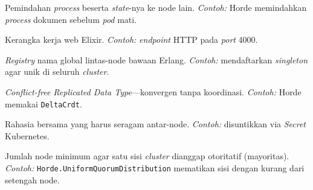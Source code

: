 \begin{description}[style=nextline,leftmargin=1.4em]
  \item[Handoff] Pemindahan \emph{process} beserta \emph{state}-nya ke node lain.
    \emph{Contoh:} Horde memindahkan \emph{process} dokumen sebelum \emph{pod} mati.
  \item[Phoenix] Kerangka kerja web Elixir. \emph{Contoh:} \emph{endpoint} HTTP pada \emph{port} 4000.
  \item[\texttt{:global}] \emph{Registry} nama global lintas-node bawaan Erlang.
    \emph{Contoh:} mendaftarkan \emph{singleton} agar unik di seluruh \emph{cluster}.
  \item[CRDT] \emph{Conflict-free Replicated Data Type}---konvergen tanpa koordinasi.
    \emph{Contoh:} Horde memakai \texttt{DeltaCrdt}.
  \item[Erlang distribution cookie] Rahasia bersama yang harus seragam antar-node.
    \emph{Contoh:} disuntikkan via \emph{Secret} Kubernetes.
  \item[Kuorum BEAM] Jumlah node minimum agar satu sisi \emph{cluster} dianggap otoritatif
    (mayoritas). \emph{Contoh:} \texttt{Horde.UniformQuorumDistribution} mematikan sisi
    dengan kurang dari setengah node.
\end{description}

